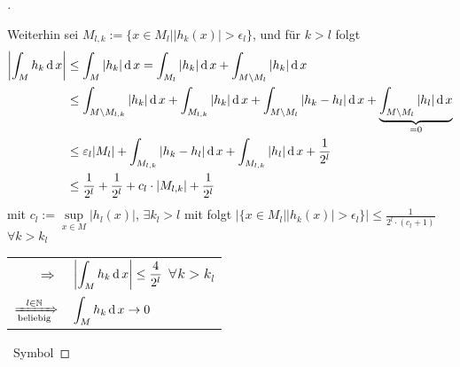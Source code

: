 \begin{proof}[]
\begin{itemize}
	Weiterhin sei $M_{l,k} := \{ x\in M_l \mid \vert h_k(x)\vert > \epsilon_l \}$, und für $k > l$ folgt
	\begin{align*}
		\left\vert\int_M h_k\operatorname{d} x \right\vert &\le \int_M \vert h_k\vert \operatorname{d} x = \int_{M_l} \vert h_k\vert \operatorname{d} x + \int_{M\setminus M_l} \vert h_k\vert \operatorname{d} x \\
		&\le \int_{ M\setminus M_{l,k}} \vert h_k\vert \operatorname{d} x + \int_{M_{l,k}} \vert h_k\vert \operatorname{d} x + \int_{M\setminus M_l} \vert h_k - h_l\vert \operatorname{d} x + \underbrace{\int_{M\setminus M_l} \vert h_l\vert \operatorname{d} x}_{=0} \\
		&\le \varepsilon_l \vert M_l\vert + \int_{M_{l,k}} \vert h_k - h_l\vert \operatorname{d} x + \int_{M_{l,k}} \vert h_l\vert \operatorname{d} x + \frac{1}{2^l} \\
		&\le \frac{1}{2^l} + \frac{1}{2^l} + c_l \cdot \vert M_{l,k}\vert + \frac{1}{2^l}
	\end{align*}
	mit $c_l := \sup\limits_{x\in M} \vert h_l(x)\vert$, $\exists k_l > l$ mit  folgt $\vert \{ x\in M_l\mid \vert h_k(x)\vert > \epsilon_l \} \vert \le \frac{1}{2^l \cdot (c_l + 1)}$ $\forall k > k_l$
	
	\begin{tabularx}{\linewidth}{r@{\ \ }X}
	$\Rightarrow$ & $\displaystyle \left\vert \int_M h_k\operatorname{d} x \right\vert \le \frac{4}{2^l}$ $\forall k>k_l$ \\
	$\xRightarrow[\text{beliebig}]{l\in\mathbb{N}}$ & $\displaystyle \int_M h_k \operatorname{d} x\to 0$
	\end{tabularx}
	\end{itemize}
	\ \hfill\csname\InTheoType Symbol\endcsname
\end{proof}

